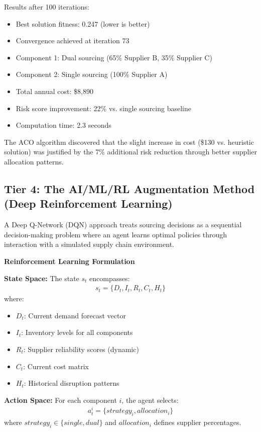 \documentclass{article}
\begin{document}
Results after 100 iterations:
\begin{itemize}
\item Best solution fitness: 0.247 (lower is better)
\item Convergence achieved at iteration 73
\item Component 1: Dual sourcing (65\% Supplier B, 35\% Supplier C)
\item Component 2: Single sourcing (100\% Supplier A)
\item Total annual cost: \$8,890
\item Risk score improvement: 22\% vs. single sourcing baseline
\item Computation time: 2.3 seconds
\end{itemize}

The ACO algorithm discovered that the slight increase in cost (\$130 vs. heuristic solution) was justified by the 7\% additional risk reduction through better supplier allocation patterns.

\subsection{Tier 4: The AI/ML/RL Augmentation Method (Deep Reinforcement Learning)}

A Deep Q-Network (DQN) approach treats sourcing decisions as a sequential decision-making problem where an agent learns optimal policies through interaction with a simulated supply chain environment.

\textbf{Reinforcement Learning Formulation}

\textbf{State Space:} The state $s_t$ encompasses:
\begin{align}
s_t = \{D_t, I_t, R_t, C_t, H_t\}
\end{align}
where:
\begin{itemize}
\item $D_t$: Current demand forecast vector
\item $I_t$: Inventory levels for all components
\item $R_t$: Supplier reliability scores (dynamic)
\item $C_t$: Current cost matrix
\item $H_t$: Historical disruption patterns
\end{itemize}

\textbf{Action Space:} For each component $i$, the agent selects:
\begin{align}
a_t^i = \{strategy_i, allocation_i\}
\end{align}
where $strategy_i \in \{single, dual\}$ and $allocation_i$ defines supplier percentages.
\end{document}

